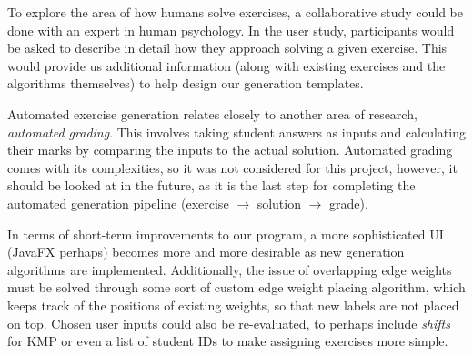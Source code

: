 \documentclass{l4proj}
\begin{document}
To explore the area of how humans solve exercises, a collaborative study could be done with an expert in human psychology. In the user study, participants would be asked to describe in detail how they approach solving a given exercise. This would provide us additional information (along with existing exercises and the algorithms themselves) to help design our generation templates.

Automated exercise generation relates closely to another area of research, \emph{automated grading}. This involves taking student answers as inputs and calculating their marks by comparing the inputs to the actual solution. Automated grading comes with its complexities, so it was not considered for this project, however, it should be looked at in the future, as it is the last step for completing the automated generation pipeline (exercise $\rightarrow$ solution $\rightarrow$ grade).

In terms of short-term improvements to our program, a more sophisticated UI (JavaFX perhaps) becomes more and more desirable as new generation algorithms are implemented. Additionally, the issue of overlapping edge weights must be solved through some sort of custom edge weight placing algorithm, which keeps track of the positions of existing weights, so that new labels are not placed on top. Chosen user inputs could also be re-evaluated, to perhaps include \emph{shifts} for KMP or even a list of student IDs to make assigning exercises more simple.

%
% 
\end{document}
